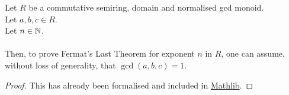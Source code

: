







\begin{lemma}
    \label{lmm:fermatLastTheoremWith_of_fermatLastTheoremWith_coprime}
    \leanok
    Let $R$ be a commutative semiring, domain and normalised gcd monoid.\\%
    Let $a, b, c \in R$. \\
    Let $n \in \mathbb{N}$. \\\\
    Then, to prove Fermat's Last Theorem for exponent $n$ in $R$,
    one can assume, without loss of generality, that $\gcd(a,b,c)=1$.
\end{lemma}
\begin{proof}
    \leanok
    This has already been formalised and included in \href{https://pitmonticone.github.io/FLT3/docs/FLT3/Mathlib/NumberTheory/FLT/Basic.html#fermatLastTheoremWith_of_fermatLastTheoremWith_coprime}{Mathlib}.
\end{proof}

